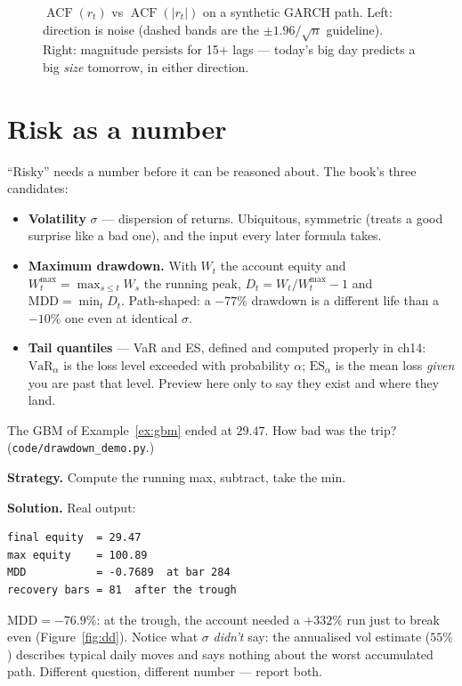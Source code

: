 \begin{figure}[ht]\centering

\caption{$\operatorname{ACF}(r_t)$ vs $\operatorname{ACF}(|r_t|)$ on a
synthetic GARCH path. Left: direction is noise (dashed bands are the
$\pm1.96/\sqrt n$ guideline). Right: magnitude persists for 15+ lags
--- today's big day predicts a big \emph{size} tomorrow, in either
direction.}
\label{fig:acf}
\end{figure}

\section{Risk as a number}\label{sec:risk}
``Risky'' needs a number before it can be reasoned about. The book's
three candidates:

\begin{itemize}
\item \textbf{Volatility} $\sigma$ --- dispersion of returns.
Ubiquitous, symmetric (treats a good surprise like a bad one), and the
input every later formula takes.
\item \textbf{Maximum drawdown.} With $W_t$ the account equity and
$W_t^{\max}=\max_{s\le t}W_s$ the running peak,
$D_t = W_t/W_t^{\max}-1$ and $\mathrm{MDD}=\min_t D_t$. Path-shaped:
a $-77\%$ drawdown is a different life than a $-10\%$ one even at
identical $\sigma$.
\item \textbf{Tail quantiles} --- VaR and ES, defined and computed
properly in ch14: $\mathrm{VaR}_\alpha$ is the loss level exceeded
with probability $\alpha$; $\mathrm{ES}_\alpha$ is the mean loss
\emph{given} you are past that level. Preview here only to say they
exist and where they land.
\end{itemize}

\begin{example}\label{ex:dd}
The GBM of Example~\ref{ex:gbm} ended at $29.47$. How bad was the
trip? (\texttt{code/drawdown\_demo.py}.)

\textbf{Strategy.} Compute the running max, subtract, take the min.

\textbf{Solution.} Real output:
\begin{lstlisting}[numbers=none]
final equity  = 29.47
max equity    = 100.89
MDD           = -0.7689  at bar 284
recovery bars = 81  after the trough
\end{lstlisting}
$\mathrm{MDD}=-76.9\%$: at the trough, the account needed a $+332\%$
run just to break even (Figure~\ref{fig:dd}). Notice what $\sigma$
\emph{didn't} say: the annualised vol estimate ($55\%$) describes
typical daily moves and says nothing about the worst accumulated
path. Different question, different number --- report both.
\end{example}

